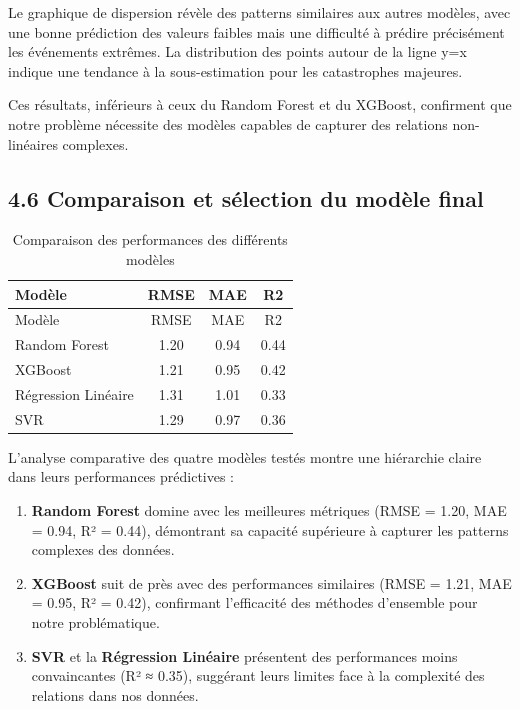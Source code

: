 \documentclass[
]{article}
\begin{document}
Le graphique de dispersion révèle des patterns similaires aux autres
modèles, avec une bonne prédiction des valeurs faibles mais une
difficulté à prédire précisément les événements extrêmes. La
distribution des points autour de la ligne y=x indique une tendance à la
sous-estimation pour les catastrophes majeures.

Ces résultats, inférieurs à ceux du Random Forest et du XGBoost,
confirment que notre problème nécessite des modèles capables de capturer
des relations non-linéaires complexes.

\subsection{4.6 Comparaison et sélection du modèle
final}\label{comparaison-et-suxe9lection-du-moduxe8le-final}

\begin{longtable}[]{@{}lccc@{}}
\caption{Comparaison des performances des différents
modèles}\tabularnewline
\toprule\noalign{}
Modèle & RMSE & MAE & R2 \\
\midrule\noalign{}
\endfirsthead
\toprule\noalign{}
Modèle & RMSE & MAE & R2 \\
\midrule\noalign{}
\endhead
\bottomrule\noalign{}
\endlastfoot
Random Forest & 1.20 & 0.94 & 0.44 \\
XGBoost & 1.21 & 0.95 & 0.42 \\
Régression Linéaire & 1.31 & 1.01 & 0.33 \\
SVR & 1.29 & 0.97 & 0.36 \\
\end{longtable}

L'analyse comparative des quatre modèles testés montre une hiérarchie
claire dans leurs performances prédictives :

\begin{enumerate}
\def\labelenumi{\arabic{enumi}.}
\item
  \textbf{Random Forest} domine avec les meilleures métriques (RMSE =
  1.20, MAE = 0.94, R² = 0.44), démontrant sa capacité supérieure à
  capturer les patterns complexes des données.
\item
  \textbf{XGBoost} suit de près avec des performances similaires (RMSE =
  1.21, MAE = 0.95, R² = 0.42), confirmant l'efficacité des méthodes
  d'ensemble pour notre problématique.
\item
  \textbf{SVR} et la \textbf{Régression Linéaire} présentent des
  performances moins convaincantes (R² ≈ 0.35), suggérant leurs limites
  face à la complexité des relations dans nos données.
\end{enumerate}
\end{document}
